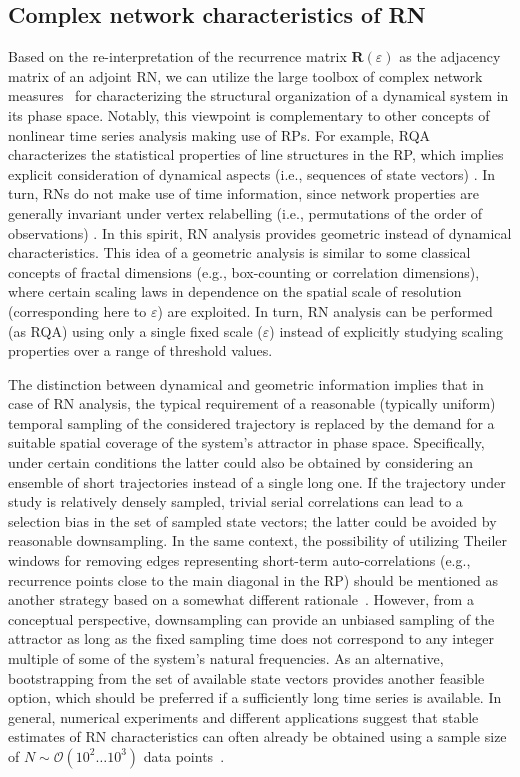 		\subsection{Complex network characteristics of RN}\label{sec:rn_measures}
		Based on the re-interpretation of the recurrence matrix $\mathbf{R}(\varepsilon)$ as the adjacency matrix of an adjoint RN, we can utilize the large toolbox of complex network measures~\cite{Albert2002,Boccaletti2006,Costa2007,Newman2003} for characterizing the structural organization of a dynamical system in its phase space. Notably, this viewpoint is complementary to other concepts of nonlinear time series analysis making use of RPs. For example, RQA characterizes the statistical properties of line structures in the RP, which implies explicit consideration of dynamical aspects (i.e., sequences of state vectors) \cite{marwan2007}. In turn, RNs do not make use of time information, since network properties are generally invariant under vertex relabelling (i.e., permutations of the order of observations) \cite{Donner2010a}. In this spirit, RN analysis provides geometric instead of dynamical characteristics. This idea of a geometric analysis is similar to some classical concepts of fractal dimensions (e.g., box-counting or correlation dimensions), where certain scaling laws in dependence on the spatial scale of resolution (corresponding here to $\varepsilon$) are exploited. In turn, RN analysis can be performed (as RQA) using only a single fixed scale ($\varepsilon$) instead of explicitly studying scaling properties over a range of threshold values.

		The distinction between dynamical and geometric information implies that in case of RN analysis, the typical requirement of a reasonable (typically uniform) temporal sampling of the considered trajectory is replaced by the demand for a suitable spatial coverage of the system's attractor in phase space. Specifically, under certain conditions the latter could also be obtained by considering an ensemble of short trajectories instead of a single long one. If the trajectory under study is relatively densely sampled, trivial serial correlations can lead to a selection bias in the set of sampled state vectors; the latter could be avoided by reasonable downsampling. In the same context, the possibility of utilizing Theiler windows for removing edges representing short-term auto-correlations (e.g., recurrence points close to the main diagonal in the RP) should be mentioned as another strategy based on a somewhat different rationale~\cite{Donner2010a}. However, from a conceptual perspective, downsampling can provide an unbiased sampling of the attractor as long as the fixed sampling time does not correspond to any integer multiple of some of the system's natural frequencies. As an alternative, bootstrapping from the set of available state vectors provides another feasible option, which should be preferred if a sufficiently long time series is available. In general, numerical experiments and different applications suggest that stable estimates of RN characteristics can often already be obtained using a sample size of $N\sim\mathcal{O}(10^2\dots 10^3)$ data points~\cite{Donges2011,Donges2011a}.

